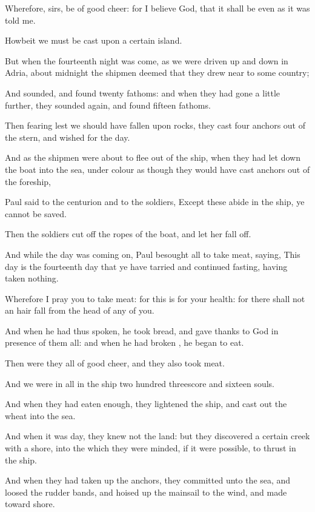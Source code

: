 {Wherefore,
sirs, be of good
cheer:
for I
believe
God,
that
it shall
be
even
as it was
told
me.

Howbeit
we
must be
cast
upon a
certain
island.

But
when the
fourteenth
night was
come, as
we were driven up and
down
in
Adria,
about
midnight the
shipmen deemed
that
they drew near
to
some
country;

And
sounded, and
found
{}
twenty
fathoms:
and when they had
gone a little
further, they
sounded
again,
and
found
{}
fifteen
fathoms.

Then
fearing
lest we should have
fallen
upon
rocks, they
cast
four
anchors out
of the
stern, and
wished
for the
day.

And as the
shipmen were
about to
flee out
of the
ship,
when they had let
down the
boat
into the
sea, under
colour as
though they
would have
cast
anchors out
of the
foreship,

Paul
said to the
centurion
and to the
soldiers,
Except
these
abide
in the
ship,
ye
cannot be
saved.

Then the
soldiers cut
off the
ropes of the
boat,
and
let
her fall
off.

And
while the
day
was coming
on,
Paul
besought
{}
all to
take
meat,
saying, This
day is the
fourteenth
day
that ye have
tarried and
continued
fasting, having
taken
nothing.

Wherefore I
pray
you to
take
{}
meat:
for this
is
for
your
health:
for there
shall
not an
hair
fall
from the
head of any of
you.

And
when he
had
thus
spoken, he
took
bread,
and gave
thanks to
God in
presence of them
all:
and when he had
broken
{}, he
began to
eat.

Then
were they
all of good
cheer,
and
they also
took
{}
meat.

And we
were in
all
in the
ship two
hundred threescore
and
sixteen
souls.

And
when they had
eaten
enough, they
lightened the
ship, and cast
out the
wheat
into the
sea.

And
when it
was
day, they
knew
not the
land:
but they
discovered a
certain
creek
with a
shore,
into the
which they were
minded,
if it were
possible, to
thrust in the
ship.

And when they had taken
up the
anchors, they
committed
{}
unto the
sea,
and
loosed the
rudder
bands,
and hoised
up the
mainsail to the
wind, and
made
toward
shore.

}
